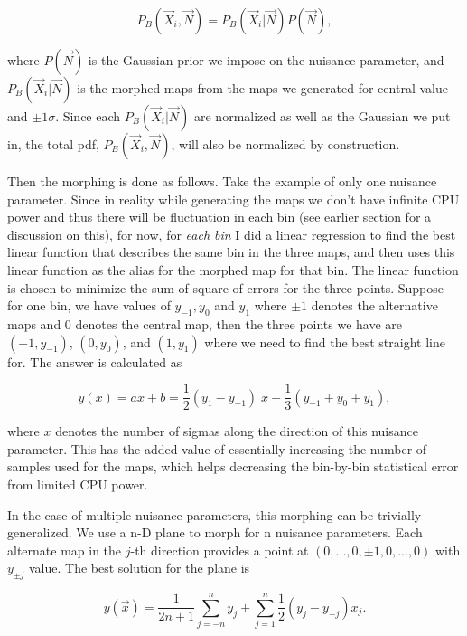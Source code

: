 \documentclass{cmspaper}
\begin{document}
\begin{equation}
P_B(\vec{X}_i, \vec{N}) = P_B(\vec{X}_i | \vec{N}) P(\vec{N}),
\end{equation}

where $P(\vec{N})$ is the Gaussian prior we impose on the nuisance parameter, and
$P_B(\vec{X}_i | \vec{N})$ is the morphed maps from the maps we generated for central value
and $\pm 1 \sigma$.  Since each $P_B(\vec{X}_i | \vec{N})$ are normalized as well as
the Gaussian we put in, the total pdf, $P_B(\vec{X}_i, \vec{N})$, will also be normalized
by construction.

Then the morphing is done as follows.  Take the example of only one nuisance parameter.
Since in reality while generating the
maps we don't have infinite CPU power and thus there will be fluctuation in each
bin (see earlier section for a discussion on this), for now, for {\it each bin} I did
a linear regression to find the best linear function that describes the same
bin in the three maps, and then uses this linear function as the alias for
the morphed map for that bin.  The linear function is chosen to minimize the
sum of square of errors for the three points.  Suppose for one bin, we have
values of $y_{-1}, y_{0}$ and $y_{1}$ where $\pm 1$ denotes the alternative
maps and $0$ denotes the central map, then the three points we have are
$(-1, y_{-1})$, $(0, y_{0})$, and $(1, y_{1})$ where we need to find the best
straight line for.  The answer is calculated as

\begin{equation}
y(x) = a x + b = \dfrac{1}{2}(y_1 - y_{-1})\; x + \dfrac{1}{3}(y_{-1} + y_0 + y_1),
\end{equation}

where $x$ denotes the number of sigmas along the direction of this nuisance parameter.
This has the added value of essentially increasing the number of samples used for
the maps, which helps decreasing the bin-by-bin statistical error from limited CPU power.

In the case of multiple nuisance parameters, this morphing can be trivially generalized.
We use a n-D plane to morph for n nuisance parameters.  Each alternate map in the $j$-th
direction provides a point at $(0, ..., 0, \pm1, 0, ..., 0)$ with $y_{\pm j}$ value.
The best solution for the plane is

\begin{equation}
y(\vec{x}) = \dfrac{1}{2n + 1}\sum_{j=-n}^{n} y_j + 
   \sum_{j = 1}^{n} \dfrac{1}{2}(y_j - y_{-j}) x_j.
\end{equation}
\end{document}

